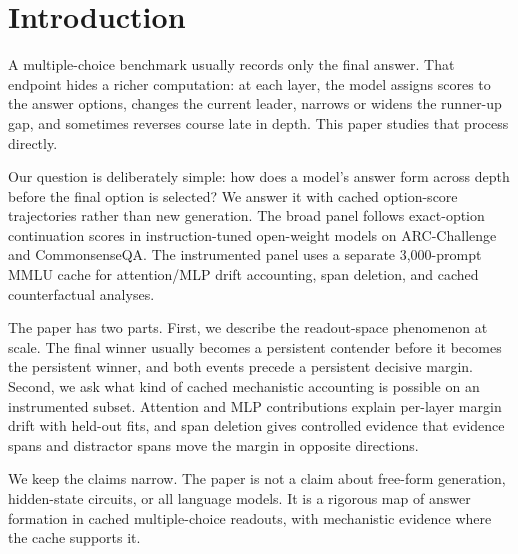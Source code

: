\section{Introduction}

A multiple-choice benchmark usually records only the final answer. That endpoint hides a richer computation: at each layer, the model assigns scores to the answer options, changes the current leader, narrows or widens the runner-up gap, and sometimes reverses course late in depth. This paper studies that process directly.

Our question is deliberately simple: how does a model's answer form across depth before the final option is selected? We answer it with cached option-score trajectories rather than new generation. The broad panel follows exact-option continuation scores in \ModelCount{} instruction-tuned open-weight models on ARC-Challenge and CommonsenseQA. The instrumented panel uses a separate 3,000-prompt MMLU cache for attention/MLP drift accounting, span deletion, and cached counterfactual analyses.

The paper has two parts. First, we describe the readout-space phenomenon at scale. The final winner usually becomes a persistent contender before it becomes the persistent winner, and both events precede a persistent decisive margin. Second, we ask what kind of cached mechanistic accounting is possible on an instrumented subset. Attention and MLP contributions explain per-layer margin drift with held-out fits, and span deletion gives controlled evidence that evidence spans and distractor spans move the margin in opposite directions.

We keep the claims narrow. The paper is not a claim about free-form generation, hidden-state circuits, or all language models. It is a rigorous map of answer formation in cached multiple-choice readouts, with mechanistic evidence where the cache supports it.
